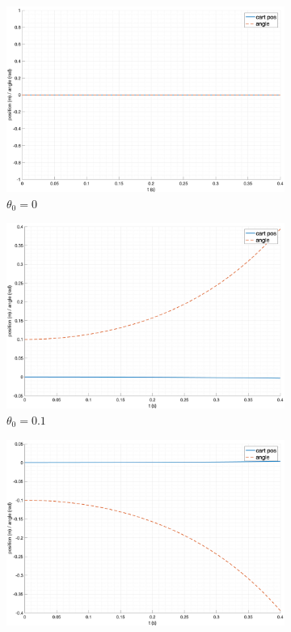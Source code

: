\begin{figure}[ht!]
    \centering
    \begin{subfigure}[b]{0.45\textwidth}
        \includegraphics[width=\textwidth]{media/plots/free_motion/nonlin_1.png}
        \caption{$\theta_0 = 0$}
  \end{subfigure}
    \begin{subfigure}[b]{0.45\textwidth}
        \includegraphics[width=\textwidth]{media/plots/free_motion/nonlin_2.png}
        \caption{$\theta_0 = 0.1$}
    \end{subfigure}
    \begin{subfigure}[b]{0.45\textwidth}
        \includegraphics[width=\textwidth]{media/plots/free_motion/nonlin_3.png}

\end{subfigure}
\end{figure}

